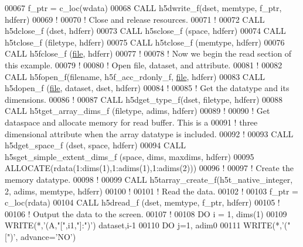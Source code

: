 \begin{DoxyCode}
00067   f\_ptr = c\_loc(wdata)
00068   \textcolor{keyword}{CALL }h5dwrite\_f(dset, memtype, f\_ptr, hdferr)
00069   \textcolor{comment}{!}
00070   \textcolor{comment}{! Close and release resources.}
00071   \textcolor{comment}{!}
00072   \textcolor{keyword}{CALL }h5dclose\_f (dset, hdferr)
00073   \textcolor{keyword}{CALL }h5sclose\_f (space, hdferr)
00074   \textcolor{keyword}{CALL }h5tclose\_f (filetype, hdferr)
00075   \textcolor{keyword}{CALL }h5tclose\_f (memtype, hdferr)
00076   \textcolor{keyword}{CALL }h5fclose\_f (\hyperlink{structfile}{file}, hdferr)
00077   \textcolor{comment}{!}
00078   \textcolor{comment}{! Now we begin the read section of this example. }
00079   \textcolor{comment}{!}
00080   \textcolor{comment}{! Open file, dataset, and attribute.}
00081   \textcolor{comment}{!}
00082   \textcolor{keyword}{CALL }h5fopen\_f(filename, h5f\_acc\_rdonly\_f, \hyperlink{structfile}{file}, hdferr)
00083   \textcolor{keyword}{CALL }h5dopen\_f (\hyperlink{structfile}{file}, dataset, dset, hdferr)
00084   \textcolor{comment}{!}
00085   \textcolor{comment}{! Get the datatype and its dimensions.}
00086   \textcolor{comment}{!}
00087   \textcolor{keyword}{CALL }h5dget\_type\_f(dset, filetype, hdferr)
00088   \textcolor{keyword}{CALL }h5tget\_array\_dims\_f (filetype, adims, hdferr)
00089   \textcolor{comment}{!}
00090   \textcolor{comment}{! Get dataspace and allocate memory for read buffer.  This is a}
00091   \textcolor{comment}{! three dimensional attribute when the array datatype is included.}
00092   \textcolor{comment}{!}
00093   \textcolor{keyword}{CALL }h5dget\_space\_f (dset, space, hdferr)
00094   \textcolor{keyword}{CALL }h5sget\_simple\_extent\_dims\_f (space, dims, maxdims, hdferr)
00095   \textcolor{keyword}{ALLOCATE}(rdata(1:dims(1),1:adims(1),1:adims(2)))
00096   \textcolor{comment}{!}
00097   \textcolor{comment}{! Create the memory datatype.}
00098   \textcolor{comment}{! }
00099   \textcolor{keyword}{CALL }h5tarray\_create\_f(h5t\_native\_integer, 2, adims, memtype, hdferr)
00100   \textcolor{comment}{!}
00101   \textcolor{comment}{! Read the data.}
00102   \textcolor{comment}{!}
00103   f\_ptr = c\_loc(rdata)
00104   \textcolor{keyword}{CALL }h5dread\_f (dset, memtype, f\_ptr, hdferr)
00105   \textcolor{comment}{!}
00106   \textcolor{comment}{! Output the data to the screen.}
00107   \textcolor{comment}{!}
00108   \textcolor{keywordflow}{DO} i = 1, dims(1)
00109      \textcolor{keyword}{WRITE}(*,\textcolor{stringliteral}{'(A,"[",i1,"]:")'}) dataset,i-1
00110      \textcolor{keywordflow}{DO} j=1, adim0
00111         \textcolor{keyword}{WRITE}(*,\textcolor{stringliteral}{'(" [")'}, advance=\textcolor{stringliteral}{'NO'})

\end{DoxyCode}
